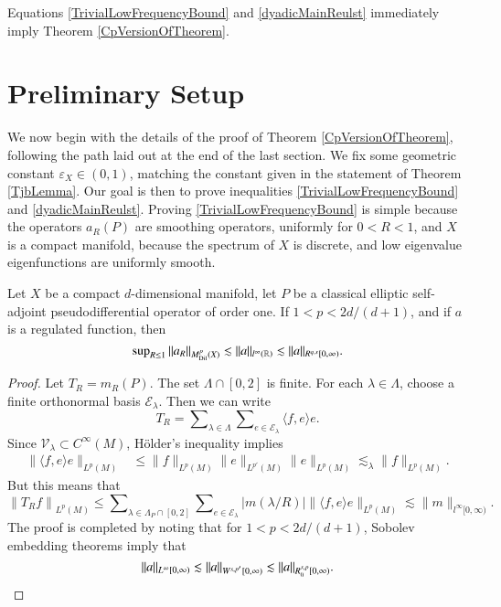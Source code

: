 %
Equations \eqref{TrivialLowFrequencyBound} and \eqref{dyadicMainReulst} immediately imply Theorem \ref{CpVersionOfTheorem}.


\section{Preliminary Setup} \label{PrelimSetup}

We now begin with the details of the proof of Theorem \ref{CpVersionOfTheorem}, following the path laid out at the end of the last section. We fix some geometric constant $\varepsilon_X \in (0,1)$, matching the constant given in the statement of Theorem \ref{TjbLemma}. Our goal is then to prove inequalities \eqref{TrivialLowFrequencyBound} and \eqref{dyadicMainReulst}. Proving \eqref{TrivialLowFrequencyBound} is simple because the operators $a_R(P)$ are smoothing operators, uniformly for $0 < R < 1$, and $X$ is a compact manifold, because the spectrum of $X$ is discrete, and low eigenvalue eigenfunctions are uniformly smooth.

\begin{lemma} \label{lowjLemma}
    Let $X$ be a compact $d$-dimensional manifold, let $P$ be a classical elliptic self-adjoint pseudodifferential operator of order one. If $1 < p < 2d/(d+1)$, and if $a$ is a regulated function, then
    \begin{equation}
        \sup\nolimits_{R \leq 1} \| a_R \|_{M^p_{\text{Dil}}(X)} \lesssim \| a \|_{l^\infty(\operatorname{\mathbb{R}})} \lesssim \| a \|_{R^{q,s}[0,\infty)}.
    \end{equation}
\end{lemma}
\begin{proof}
    Let $T_R = m_R(P)$. The set $\Lambda \cap [0,2]$ is finite. For each $\lambda \in \Lambda$, choose a finite orthonormal basis $\mathcal{E}_\lambda$. Then we can write
    \begin{equation}
        T_R = \sum\nolimits_{\lambda \in \Lambda} \sum\nolimits_{e \in \mathcal{E}_\lambda} \langle f, e \rangle e.
    \end{equation}
    Since $\mathcal{V}_\lambda \subset C^\infty(M)$, H\"{o}lder's inequality implies
    \begin{equation}
    \begin{split}
        \| \langle f, e \rangle e \|_{L^p(M)} &\leq \| f \|_{L^p(M)} \| e \|_{L^{p'}(M)} \| e \|_{L^p(M)} \lesssim_\lambda \| f \|_{L^p(M)}.
    \end{split}
    \end{equation}
    But this means that
    \begin{equation}
        \left\| T_R f \right\|_{L^p(M)} \leq \sum\nolimits_{\lambda \in \Lambda_P \cap [0,2]} \sum\nolimits_{e \in \mathcal{E}_\lambda} |m(\lambda/R)| \| \langle f, e \rangle e \|_{L^p(M)} \lesssim \| m \|_{l^\infty[0,\infty)}.
    \end{equation}
    The proof is completed by noting that for $1 < p < 2d/(d+1)$, Sobolev embedding theorems imply that
    \[ \| a \|_{L^\infty[0,\infty)} \lesssim \| a \|_{W^{s,p'}[0,\infty)} \lesssim \| a \|_{R^{s,p}_0[0,\infty)}. \qedhere \]
\end{proof}


